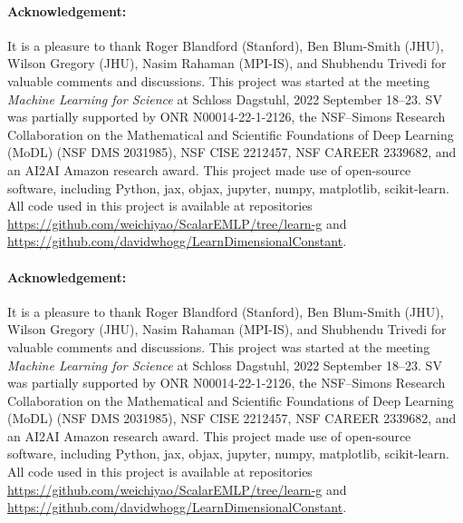 \documentclass[accepted]{article}
\begin{document}
\newcommand{\ack}{\paragraph{Acknowledgement:}
It is a pleasure to thank
   Roger Blandford (Stanford),
   Ben Blum-Smith (JHU),
   Wilson Gregory (JHU),
   Nasim Rahaman (MPI-IS),
   and
   Shubhendu Trivedi
for valuable comments and discussions.
This project was started at the meeting \textit{Machine Learning for Science} at Schloss Dagstuhl, 2022 September 18--23.
SV was partially supported by
   ONR N00014-22-1-2126, 
   the NSF–Simons Research Collaboration on the Mathematical and Scientific Foundations of Deep Learning (MoDL) (NSF DMS 2031985),
   NSF CISE 2212457,
   NSF CAREER 2339682,
   and
   an AI2AI Amazon research award.
This project made use of open-source software, including Python, jax, objax, jupyter, numpy, matplotlib, scikit-learn.
All code used in this project is available at repositories \url{https://github.com/weichiyao/ScalarEMLP/tree/learn-g} and \url{https://github.com/davidwhogg/LearnDimensionalConstant}.
}

\makeatletter
\if@preprint
  \ack
\else
  \if@accepted
    \ack
  \fi
\fi
\makeatother

{\raggedright


}

\appendix
\end{document}
